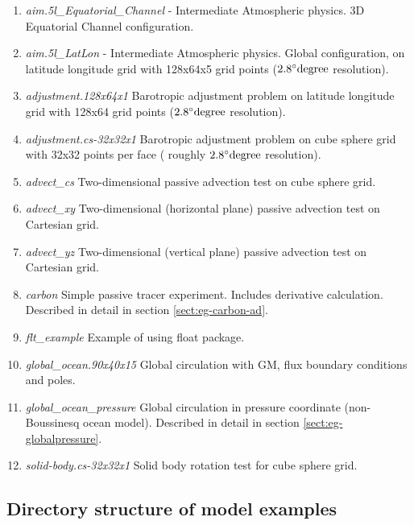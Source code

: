 \begin{enumerate}
\item \textit{aim.5l\_Equatorial\_Channel} - Intermediate Atmospheric
  physics. 3D Equatorial Channel configuration.
  
\item \textit{aim.5l\_LatLon} - Intermediate Atmospheric physics.
  Global configuration, on latitude longitude grid with 128x64x5 grid
  points ($2.8^\circ{\rm degree}$ resolution).
  
\item \textit{adjustment.128x64x1} Barotropic adjustment problem on
  latitude longitude grid with 128x64 grid points ($2.8^\circ{\rm
    degree}$ resolution).
  
\item \textit{adjustment.cs-32x32x1} Barotropic adjustment problem on
  cube sphere grid with 32x32 points per face ( roughly $2.8^\circ{\rm
    degree}$ resolution).
  
\item \textit{advect\_cs} Two-dimensional passive advection test on
  cube sphere grid.
  
\item \textit{advect\_xy} Two-dimensional (horizontal plane) passive
  advection test on Cartesian grid.
  
\item \textit{advect\_yz} Two-dimensional (vertical plane) passive
  advection test on Cartesian grid.
  
\item \textit{carbon} Simple passive tracer experiment. Includes
  derivative calculation. Described in detail in section
  \ref{sect:eg-carbon-ad}.

\item \textit{flt\_example} Example of using float package.
  
\item \textit{global\_ocean.90x40x15} Global circulation with GM, flux
  boundary conditions and poles.

\item \textit{global\_ocean\_pressure} Global circulation in pressure
  coordinate (non-Boussinesq ocean model). Described in detail in
  section \ref{sect:eg-globalpressure}.
  
\item \textit{solid-body.cs-32x32x1} Solid body rotation test for cube
  sphere grid.

\end{enumerate}

\subsection{Directory structure of model examples}

